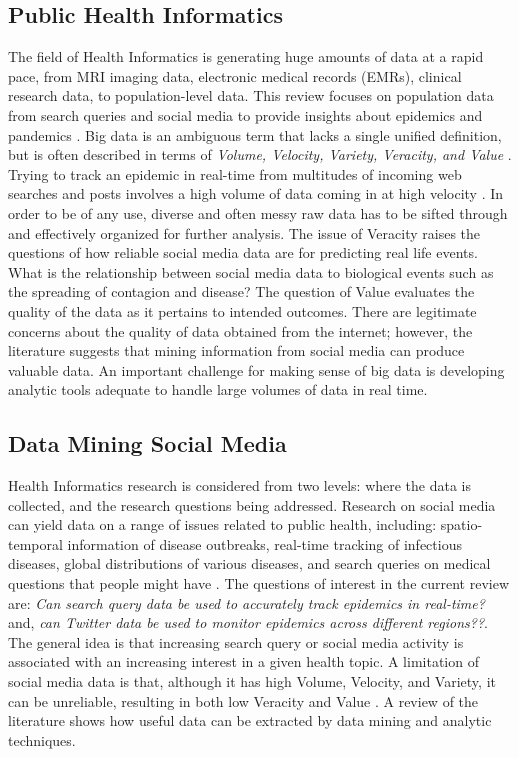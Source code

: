 \documentclass[sigconf]{acmart}
\begin{document}
\subsection{Public Health Informatics}

The field of Health Informatics is generating huge amounts of data at a rapid pace,
from MRI imaging data, electronic medical records (EMRs), clinical research data, to
population-level data. This review focuses on population data from search queries and 
social media to provide insights about epidemics and pandemics \cite{hay13, herland14}. 
Big data is an ambiguous term that lacks a single unified definition, but is often 
described in terms of {\it Volume, Velocity, Variety, Veracity, and Value}
\cite{demchenko12}. Trying to track an epidemic in real-time from multitudes of 
incoming web searches and posts involves a high volume of data coming in at high 
velocity \cite{lamb13, paul14}. In order to be of any use, diverse and often messy 
raw data has to be sifted through and effectively organized for further analysis. 
The issue of Veracity raises the questions of how reliable social media data are for 
predicting real life events. What is the relationship between social media data to 
biological events such as the spreading of contagion and disease? The question of 
Value evaluates the quality of the data as it pertains to intended outcomes. There 
are legitimate concerns about the quality of data obtained from the internet; 
however, the literature suggests that mining information from social media can 
produce valuable data. An important challenge for making sense of big data is 
developing analytic tools adequate to handle large volumes of data in real time.

\subsection{Data Mining Social Media}

Health Informatics research is considered from two levels: where the data is 
collected, and the research questions being addressed. Research on social media 
can yield data on a range of issues related to public health, including: spatio-
temporal information of disease outbreaks, real-time tracking of infectious diseases, 
global distributions of various diseases, and search queries on medical questions 
that people might have \cite{herland14}. The questions of interest in the current 
review are: \textit{Can search query data be used to accurately track epidemics in 
real-time?} and, \textit{can Twitter data be used to monitor epidemics across 
different regions??}. The general idea is that increasing search query or social 
media activity is associated with an increasing interest in a given health topic. 
A limitation of social media data is that, although it has high Volume, Velocity, 
and Variety, it can be unreliable, resulting in both low Veracity and Value 
\cite{hay13, lazer14}. A review of the literature shows how useful data can be 
extracted by data mining and analytic techniques. 
\end{document}
